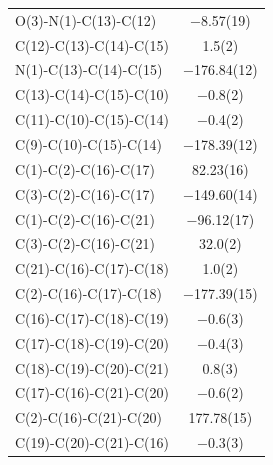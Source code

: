 \begin{center}
{\begin{supertabular}{p{1.5in}c}
O(3)-N(1)-C(13)-C(12)&$-$8.57(19)\\
C(12)-C(13)-C(14)-C(15)&1.5(2)\\
N(1)-C(13)-C(14)-C(15)&$-$176.84(12)\\
C(13)-C(14)-C(15)-C(10)&$-$0.8(2)\\
C(11)-C(10)-C(15)-C(14)&$-$0.4(2)\\
C(9)-C(10)-C(15)-C(14)&$-$178.39(12)\\
C(1)-C(2)-C(16)-C(17)&82.23(16)\\
C(3)-C(2)-C(16)-C(17)&$-$149.60(14)\\
C(1)-C(2)-C(16)-C(21)&$-$96.12(17)\\
C(3)-C(2)-C(16)-C(21)&32.0(2)\\
C(21)-C(16)-C(17)-C(18)&1.0(2)\\
C(2)-C(16)-C(17)-C(18)&$-$177.39(15)\\
C(16)-C(17)-C(18)-C(19)&$-$0.6(3)\\
C(17)-C(18)-C(19)-C(20)&$-$0.4(3)\\
C(18)-C(19)-C(20)-C(21)&0.8(3)\\
C(17)-C(16)-C(21)-C(20)&$-$0.6(2)\\
C(2)-C(16)-C(21)-C(20)&177.78(15)\\
C(19)-C(20)-C(21)-C(16)&$-$0.3(3)\\
\end{supertabular}
}
\end{center}



